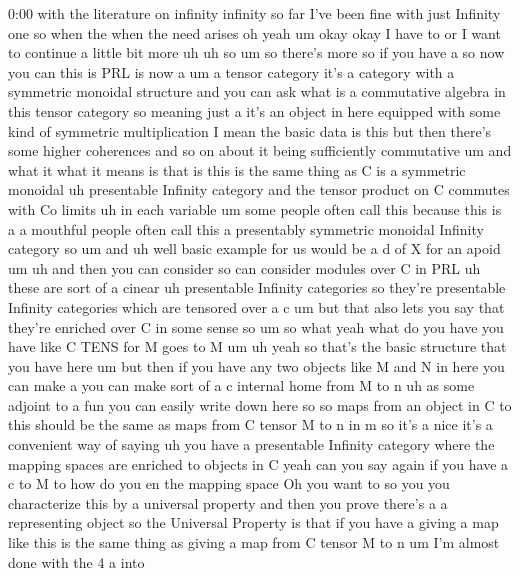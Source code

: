 \begin{unfinished}{0:00}
with  the  literature  on  infinity  infinity
so  far  I've  been  fine  with  just  Infinity
one  so  when  the  when  the  need  arises
oh
yeah  um
okay  okay  I  have  to  or  I  want  to
continue  a  little  bit  more
uh  uh
so
um  so  there's
more  so  if  you  have  a  so  now  you
can  this  is  PRL  is  now  a  um  a  tensor
category  it's  a  category  with  a
symmetric  monoidal  structure  and  you  can
ask  what  is  a  commutative  algebra  in
this  tensor  category  so  meaning  just  a
it's  an  object  in  here  equipped  with
some  kind  of  symmetric  multiplication  I
mean  the  basic  data  is  this  but  then
there's  some  higher  coherences  and  so  on
about  it  being  sufficiently
commutative  um  and  what  it  what  it  means
is  that  is  this  is  the  same  thing  as  C
is  a  symmetric
monoidal  uh
presentable  Infinity  category  and  the
tensor  product  on
C  commutes  with  Co
limits  uh  in  each  variable
um  some  people  often  call  this  because
this  is  a  a  mouthful  people  often  call
this  a  presentably  symmetric  monoidal
Infinity  category
so  um  and  uh  well  basic  example  for  us
would  be  a  d  of  X  for  an
apoid
um  uh  and  then  you  can  consider  so  can
consider  modules  over  C  in
PRL  uh  these  are  sort  of  a
cinear  uh
presentable
Infinity
categories  so  they're  presentable
Infinity  categories  which  are  tensored
over  a
c
um  but  that  also  lets  you  say  that
they're  enriched  over  C  in  some  sense  so
um  so  what  yeah  what  do  you  have  you
have  like  C  TENS  for  M  goes  to  M
um
uh  yeah  so  that's  the  basic  structure
that  you  have  here  um  but  then  if  you
have  any  two  objects  like  M  and  N  in
here  you  can  make
a  you  can  make  sort  of  a  c  internal  home
from  M  to  n  uh  as  some  adjoint  to  a  fun
you  can  easily  write  down  here  so  so
maps  from  an  object  in  C  to  this  should
be  the  same  as  maps  from  C  tensor  M  to  n
in  m  so  it's  a  nice  it's  a  convenient
way  of  saying  uh  you  have  a  presentable
Infinity  category  where  the  mapping
spaces  are  enriched  to  objects  in  C
yeah  can  you  say  again  if  you  have  a  c
to  M  to  how  do  you  en  the  mapping  space
Oh  you  want  to  so  you  you  characterize
this  by  a  universal  property  and  then
you  prove  there's  a  a  representing
object  so  the  Universal  Property  is  that
if  you  have  a  giving  a  map  like  this  is
the  same  thing  as  giving  a  map  from  C
tensor  M  to
n  um  I'm  almost  done  with  the  4  a  into

\end{unfinished}
